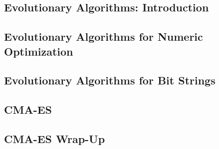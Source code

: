\subsection{Evolutionary Algorithms: Introduction}


\subsection{Evolutionary Algorithms for Numeric Optimization}


\subsection{Evolutionary Algorithms for Bit Strings}


\subsection{CMA-ES}


\subsection{CMA-ES Wrap-Up}

